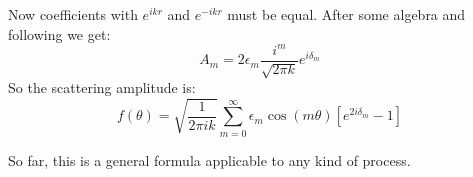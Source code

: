 Now coefficients with $ e^{ikr} $ and $ e^{-ikr} $ must be equal. After some algebra and following \cite{2DScatter2} we get:
\begin{equation}\label{AandDelta}
A_m = 2\epsilon_m \frac{i^m}{\sqrt{2\pi k}}e^{i\delta_m}
\end{equation}
So the scattering amplitude is:
\begin{equation}
f(\theta) = \sqrt{\frac{1}{2\pi i k}}\sum_{m=0}^{\infty}{\epsilon_m\cos(m\theta)\left[e^{2i\delta_m}-1\right]}
\end{equation}

So far, this is a general formula applicable to any kind of process.

